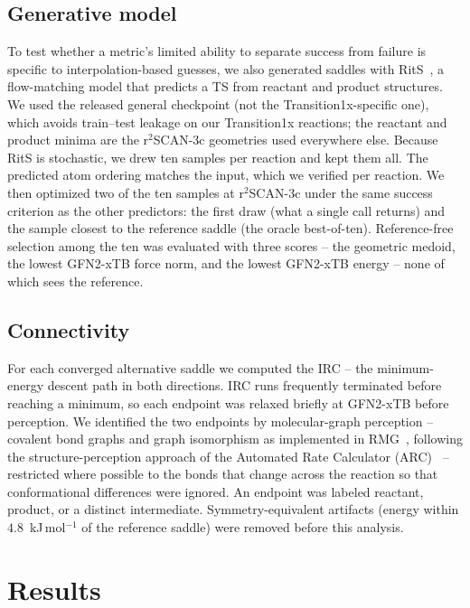 \documentclass[11pt]{article}
\begin{document}
\subsection{Generative model}
\label{sec:rits-methods}
To test whether a metric's limited ability to separate success from failure is
specific to interpolation-based guesses, we also generated saddles with
RitS~\cite{RitS}, a flow-matching model that predicts a TS from reactant and
product structures. We used the released general checkpoint
(not the Transition1x-specific one), which avoids train--test leakage on our
Transition1x reactions; the reactant and product minima are the r$^2$SCAN-3c
geometries used everywhere else. Because RitS is stochastic, we drew ten
samples per reaction and kept them all. The predicted atom ordering matches the
input, which we verified per reaction. We then optimized two of the ten samples at
r$^2$SCAN-3c under the same success criterion as the other predictors: the first
draw (what a single call returns) and the sample closest to the reference saddle
(the oracle best-of-ten). Reference-free selection among the ten was evaluated with
three scores -- the geometric medoid, the lowest GFN2-xTB force norm, and the
lowest GFN2-xTB energy -- none of which sees the reference.

\subsection{Connectivity}
For each converged alternative saddle we computed the IRC -- the
minimum-energy descent path in both directions. IRC runs frequently
terminated before reaching a minimum, so each endpoint was relaxed briefly at
GFN2-xTB before perception. We
identified the two endpoints by molecular-graph perception -- covalent bond graphs
and graph isomorphism as implemented in RMG~\cite{RMGv3,RMGv4,RMGdb}, following the structure-perception approach of the
Automated Rate Calculator (ARC)~\cite{ARC} -- restricted where possible to the
bonds that change across the reaction so that conformational differences were
ignored. An endpoint was labeled reactant, product, or a distinct intermediate.
Symmetry-equivalent artifacts (energy within $4.8$~kJ\,mol$^{-1}$ of the reference saddle)
were removed before this analysis.

\section{Results}
\end{document}

